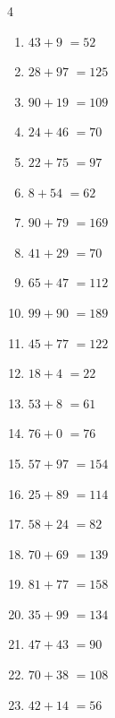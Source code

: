 \begin{multicols}{4}
\begin{enumerate}
  \item $43+9$
        $=52$

  \item $28+97$
        $=125$

  \item $90+19$
        $=109$

  \item $24+46$
        $=70$

  \item $22+75$
        $=97$

  \item $8+54$
        $=62$

  \item $90+79$
        $=169$

  \item $41+29$
        $=70$

  \item $65+47$
        $=112$

  \item $99+90$
        $=189$

  \item $45+77$
        $=122$

  \item $18+4$
        $=22$

  \item $53+8$
        $=61$

  \item $76+0$
        $=76$

  \item $57+97$
        $=154$

  \item $25+89$
        $=114$

  \item $58+24$
        $=82$

  \item $70+69$
        $=139$

  \item $81+77$
        $=158$

  \item $35+99$
        $=134$

  \item $47+43$
        $=90$

\columnbreak %

  \item $70+38$
        $=108$

  \item $42+14$
        $=56$


\end{enumerate}
\end{multicols}

